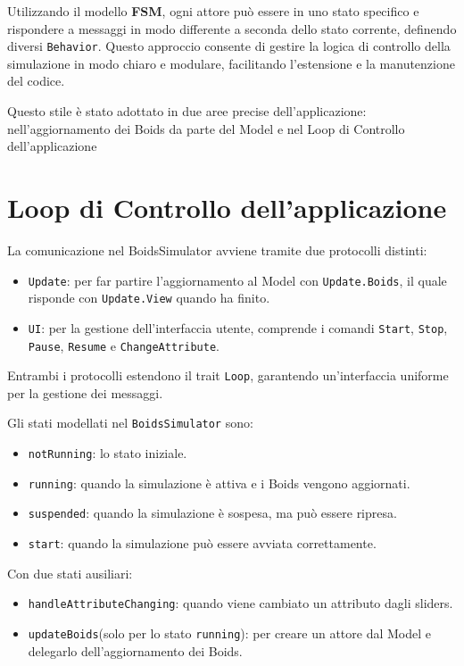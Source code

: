\documentclass[a4paper,12pt]{report}
\begin{document}
    Utilizzando il modello \textbf{FSM}, ogni attore può essere in uno stato specifico e rispondere a messaggi in modo differente a seconda dello stato corrente, definendo diversi  \texttt{Behavior}. Questo approccio consente di gestire la logica di controllo della simulazione in modo chiaro e modulare, facilitando l'estensione e la manutenzione del codice.

    Questo stile è stato adottato in due aree precise dell'applicazione: nell'aggiornamento dei Boids da parte del Model e nel Loop di Controllo dell'applicazione
    
    \section{Loop di Controllo dell'applicazione}
        La comunicazione nel BoidsSimulator avviene tramite due protocolli distinti:
        \begin{itemize}
            \item \texttt{Update}: per far partire l'aggiornamento al Model con \texttt{Update.Boids}, il quale risponde con \texttt{Update.View} quando ha finito. 
            \item \texttt{UI}: per la gestione dell'interfaccia utente, comprende i comandi \texttt{Start}, \texttt{Stop}, \texttt{Pause}, \texttt{Resume} e \texttt{ChangeAttribute}.
        \end{itemize}

        Entrambi i protocolli estendono il trait \texttt{Loop}, garantendo un'interfaccia uniforme per la gestione dei messaggi.

        Gli stati modellati nel \texttt{BoidsSimulator} sono:
        \begin{itemize}
            \item \texttt{notRunning}: lo stato iniziale.
            \item \texttt{running}: quando la simulazione è attiva e i Boids vengono aggiornati.
            \item \texttt{suspended}: quando la simulazione è sospesa, ma può essere ripresa.
            \item \texttt{start}: quando la simulazione può essere avviata correttamente.
        \end{itemize}

        Con due stati ausiliari:
        \begin{itemize}
            \item \texttt{handleAttributeChanging}: quando viene cambiato un attributo dagli sliders.
            \item \texttt{updateBoids}(solo per lo stato \texttt{running}): per creare un attore dal Model e delegarlo dell'aggiornamento dei Boids.
        \end{itemize}
        
\end{document}
